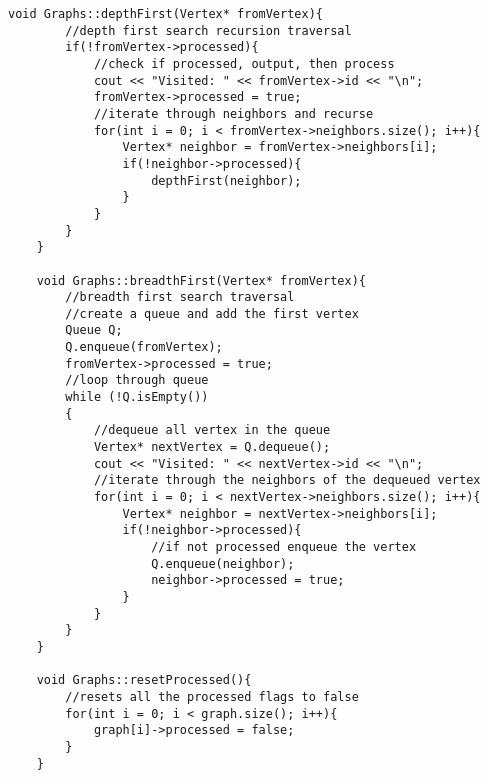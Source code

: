 \documentclass[letterpaper, 10pt,DIV=13]{scrartcl}
\numberwithin{equation}{section} %
\numberwithin{figure}{section} %
\numberwithin{table}{section} %
\begin{document}
\begin{lstlisting}[frame=single, ]
    void Graphs::depthFirst(Vertex* fromVertex){
        //depth first search recursion traversal
        if(!fromVertex->processed){
            //check if processed, output, then process
            cout << "Visited: " << fromVertex->id << "\n";
            fromVertex->processed = true;
            //iterate through neighbors and recurse
            for(int i = 0; i < fromVertex->neighbors.size(); i++){
                Vertex* neighbor = fromVertex->neighbors[i];
                if(!neighbor->processed){
                    depthFirst(neighbor);
                }
            }
        }
    }
    
    void Graphs::breadthFirst(Vertex* fromVertex){
        //breadth first search traversal
        //create a queue and add the first vertex
        Queue Q;
        Q.enqueue(fromVertex);
        fromVertex->processed = true;
        //loop through queue
        while (!Q.isEmpty())
        {
            //dequeue all vertex in the queue
            Vertex* nextVertex = Q.dequeue();
            cout << "Visited: " << nextVertex->id << "\n";
            //iterate through the neighbors of the dequeued vertex
            for(int i = 0; i < nextVertex->neighbors.size(); i++){
                Vertex* neighbor = nextVertex->neighbors[i];
                if(!neighbor->processed){
                    //if not processed enqueue the vertex
                    Q.enqueue(neighbor);
                    neighbor->processed = true;
                }
            }
        }
    }
    
    void Graphs::resetProcessed(){
        //resets all the processed flags to false
        for(int i = 0; i < graph.size(); i++){
            graph[i]->processed = false;
        }
    }
    
\end{lstlisting}
\end{document}
